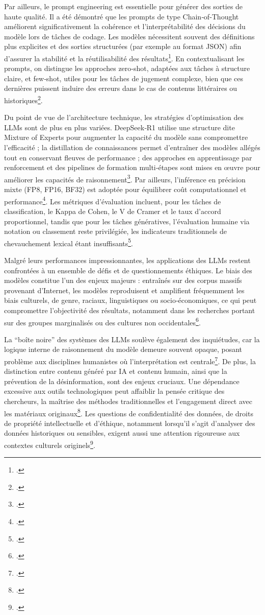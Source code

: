 \documentclass[a4paper,twoside,12pt]{book}
\begin{document}
Par ailleurs, le prompt engineering est essentielle pour générer des sorties de haute qualité. Il a été démontré que les prompts de type Chain‑of‑Thought améliorent significativement la cohérence et l'interprétabilité des décisions du modèle lors de tâches de codage. Les modèles nécessitent souvent des définitions plus explicites et des sorties structurées (par exemple au format JSON) afin d'assurer la stabilité et la réutilisabilité des résultats\footcite{dunivin2025}. En contextualisant les prompts, on distingue les approches zero‑shot, adaptées aux tâches à structure claire, et few‑shot, utiles pour les tâches de jugement complexe, bien que ces dernières puissent induire des erreurs dans le cas de contenus littéraires ou historiques\footcite{ziems2024}.

Du point de vue de l'architecture technique, les stratégies d'optimisation des LLMs sont de plus en plus variées. DeepSeek‑R1 utilise une structure dite Mixture of Experts pour augmenter la capacité du modèle sans compromettre l'efficacité ; la distillation de connaissances permet d'entraîner des modèles allégés tout en conservant fleuves de performance ; des approches en apprentissage par renforcement et des pipelines de formation multi‑étapes sont mises en œuvre pour améliorer les capacités de raisonnement\footcite{deepseek-ai2025}. Par ailleurs, l'inférence en précision mixte (FP8, FP16, BF32) est adoptée pour équilibrer coût computationnel et performance\footcite{micikevicius2018}. Les métriques d'évaluation incluent, pour les tâches de classification, le Kappa de Cohen, le V de Cramer et le taux d'accord proportionnel, tandis que pour les tâches génératives, l'évaluation humaine via notation ou classement reste privilégiée, les indicateurs traditionnels de chevauchement lexical étant insuffisants\footcite{ziems2024}.

Malgré leurs performances impressionnantes, les applications des LLMs restent confrontées à un ensemble de défis et de questionnements éthiques. Le biais des modèles constitue l'un des enjeux majeurs : entraînés sur des corpus massifs provenant d'Internet, les modèles reproduisent et amplifient fréquemment les biais culturels, de genre, raciaux, linguistiques ou socio‑économiques, ce qui peut compromettre l'objectivité des résultats, notamment dans les recherches portant sur des groupes marginalisés ou des cultures non occidentales\footcite{qu2024}.

La “boîte noire” des systèmes des LLMs soulève également des inquiétudes, car la logique interne de raisonnement du modèle demeure souvent opaque, posant problème aux disciplines humanistes où l'interprétation est centrale\footcite{liu2024}. De plus, la distinction entre contenu généré par IA et contenu humain, ainsi que la prévention de la désinformation, sont des enjeux cruciaux. Une dépendance excessive aux outils technologiques peut affaiblir la pensée critique des chercheurs, la maîtrise des méthodes traditionnelles et l'engagement direct avec les matériaux originaux\footcite{cigliano}. Les questions de confidentialité des données, de droits de propriété intellectuelle et d'éthique, notamment lorsqu'il s'agit d'analyser des données historiques ou sensibles, exigent aussi une attention rigoureuse aux contextes culturels originels\footcite{liu2024}.
\end{document}
